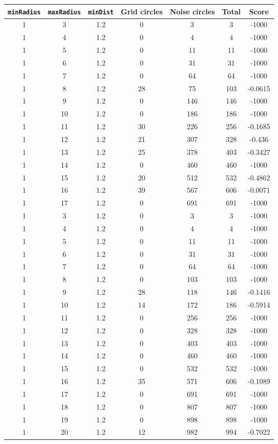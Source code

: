 \documentclass[letterpaper, 12pt]{article}
\begin{document}
\begin{longtable}{|c|c|c|c|c|c|c|}
\hline
\textbf{\texttt{minRadius}} & \textbf{\texttt{maxRadius}} & \textbf{\texttt{minDist}} & \textbf{Grid circles} & \textbf{Noise circles} & \textbf{Total} & \textbf{Score} \\
\hline
1 & 3 & 1.2 & 0 & 3 & 3 & -1000 \\
\hline
1 & 4 & 1.2 & 0 & 4 & 4 & -1000 \\
\hline
1 & 5 & 1.2 & 0 & 11 & 11 & -1000 \\
\hline
1 & 6 & 1.2 & 0 & 31 & 31 & -1000 \\
\hline
1 & 7 & 1.2 & 0 & 64 & 64 & -1000 \\
\hline
1 & 8 & 1.2 & 28 & 75 & 103 & -0.0615 \\
\hline
1 & 9 & 1.2 & 0 & 146 & 146 & -1000 \\
\hline
1 & 10 & 1.2 & 0 & 186 & 186 & -1000 \\
\hline
1 & 11 & 1.2 & 30 & 226 & 256 & -0.1685 \\
\hline
1 & 12 & 1.2 & 21 & 307 & 328 & -0.436 \\
\hline
1 & 13 & 1.2 & 25 & 378 & 403 & -0.3427 \\
\hline
1 & 14 & 1.2 & 0 & 460 & 460 & -1000 \\
\hline
1 & 15 & 1.2 & 20 & 512 & 532 & -0.4862 \\
\hline
1 & 16 & 1.2 & 39 & 567 & 606 & -0.0071 \\
\hline
1 & 17 & 1.2 & 0 & 691 & 691 & -1000 \\
\hline
1 & 3 & 1.2 & 0 & 3 & 3 & -1000 \\
\hline
1 & 4 & 1.2 & 0 & 4 & 4 & -1000 \\
\hline
1 & 5 & 1.2 & 0 & 11 & 11 & -1000 \\
\hline
1 & 6 & 1.2 & 0 & 31 & 31 & -1000 \\
\hline
1 & 7 & 1.2 & 0 & 64 & 64 & -1000 \\
\hline
1 & 8 & 1.2 & 0 & 103 & 103 & -1000 \\
\hline
1 & 9 & 1.2 & 28 & 118 & 146 & -0.1416 \\
\hline
1 & 10 & 1.2 & 14 & 172 & 186 & -0.5914 \\
\hline
1 & 11 & 1.2 & 0 & 256 & 256 & -1000 \\
\hline
1 & 12 & 1.2 & 0 & 328 & 328 & -1000 \\
\hline
1 & 13 & 1.2 & 0 & 403 & 403 & -1000 \\
\hline
1 & 14 & 1.2 & 0 & 460 & 460 & -1000 \\
\hline
1 & 15 & 1.2 & 0 & 532 & 532 & -1000 \\
\hline
1 & 16 & 1.2 & 35 & 571 & 606 & -0.1089 \\
\hline
1 & 17 & 1.2 & 0 & 691 & 691 & -1000 \\
\hline
1 & 18 & 1.2 & 0 & 807 & 807 & -1000 \\
\hline
1 & 19 & 1.2 & 0 & 898 & 898 & -1000 \\
\hline
1 & 20 & 1.2 & 12 & 982 & 994 & -0.7022 \\
\hline
\end{longtable}
\end{document}
